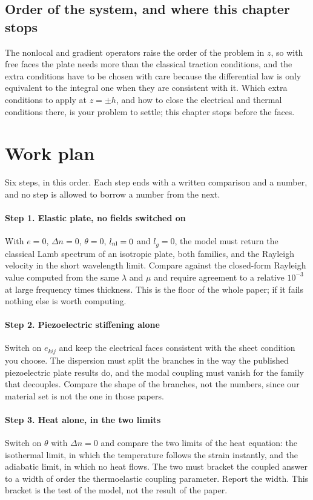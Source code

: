 \documentclass[11pt]{article}
\begin{document}
\subsection{Order of the system, and where this chapter stops}

The nonlocal and gradient operators raise the order of the problem in $z$, so with free faces the plate
needs more than the classical traction conditions, and the extra conditions have to be chosen with care
because the differential law is only equivalent to the integral one when they are consistent with it. Which
extra conditions to apply at $z=\pm h$, and how to close the electrical and thermal conditions there, is
your problem to settle; this chapter stops before the faces.

\section{Work plan}

Six steps, in this order. Each step ends with a written comparison and a number, and no step is allowed to
borrow a number from the next.

\paragraph{Step 1. Elastic plate, no fields switched on} With $e=0$, $\Delta n=0$, $\theta=0$, $l_{\rm nl}=0$
and $l_g=0$, the model must return the classical Lamb spectrum of an isotropic plate, both families, and
the Rayleigh velocity in the short wavelength limit. Compare against the closed-form Rayleigh value
computed from the same $\lambda$ and $\mu$ and require agreement to a relative $10^{-3}$ at large
frequency times thickness. This is the floor of the whole paper; if it fails nothing else is worth
computing.

\paragraph{Step 2. Piezoelectric stiffening alone} Switch on $e_{kij}$ and keep the electrical faces
consistent with the sheet condition you choose. The dispersion must split the branches in the way the
published piezoelectric plate results do, and the modal coupling must vanish for the family that
decouples. Compare the shape of the branches, not the numbers, since our material set is not the one in
those papers.

\paragraph{Step 3. Heat alone, in the two limits} Switch on $\theta$ with $\Delta n=0$ and compare the two
limits of the heat equation: the isothermal limit, in which the temperature follows the strain instantly,
and the adiabatic limit, in which no heat flows. The two must bracket the coupled answer to a width of
order the thermoelastic coupling parameter. Report the width. This bracket is the test of the model, not
the result of the paper.
\end{document}

